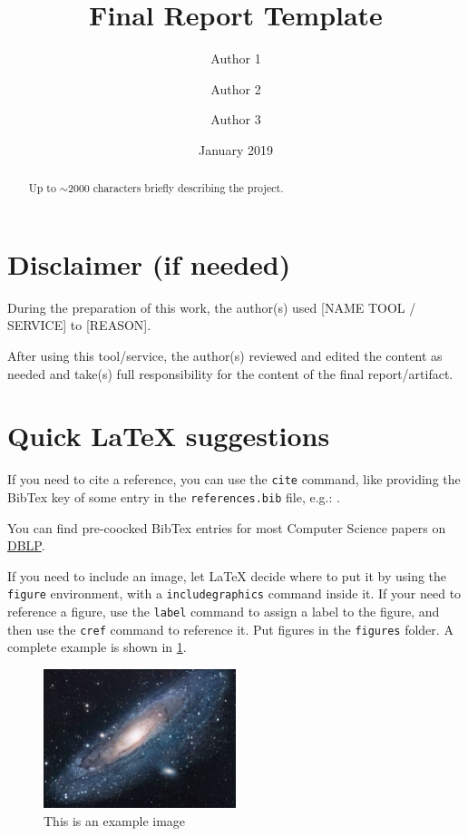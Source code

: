 \documentclass{scrartcl}
\title{\LARGE
    Final Report Template
}
\author{
    Author 1 \\ \emailaddr{author1@email.it}
    \and
    Author 2 \\ \emailaddr{author2@gmail.com}
    \and
    Author 3 \\ \emailaddr{author3@unibo.it}
}
\date{January 2019}
\begin{document}
\maketitle

\begin{abstract}
    Up to $\sim$2000 characters briefly describing the project.
\end{abstract}

\section*{Disclaimer (if needed)}

During the preparation of this work, the author(s) used [NAME TOOL / SERVICE] to [REASON].

After using this tool/service, 
the author(s) reviewed and edited the content as needed 
and take(s) full responsibility for the content of the final report/artifact.

\section*{Quick \LaTeX{} suggestions}

If you need to cite a reference, you can use the \texttt{cite} command, 
like providing the BibTex key of some entry in the \texttt{references.bib} file, 
e.g.: \cite{adams1995hitchhiker}.

You can find pre-coocked BibTex entries for most Computer Science papers on \href{https://dblp.uni-trier.de/}{DBLP}.

If you need to include an image,
let \LaTeX{} decide where to put it by using the \texttt{figure} environment,
with a \texttt{includegraphics} command inside it.
%
If your need to reference a figure,
use the \texttt{label} command to assign a label to the figure,
and then use the \texttt{cref} command to reference it.
%
Put figures in the \texttt{figures} folder.
%
A complete example is shown in \cref{fig:universe}.

\begin{figure}
    \centering
    \includegraphics[width=0.5\textwidth]{figures/universe.jpg}
    \caption{This is an example image}
    \label{fig:universe}
\end{figure}
\end{document}
